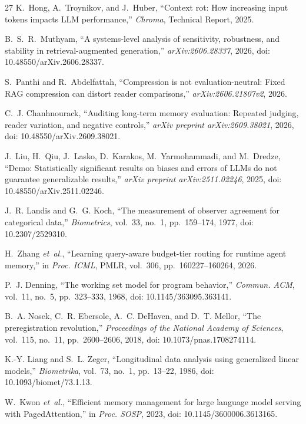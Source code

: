 \begin{thebibliography}{27}
K.~Hong, A.~Troynikov, and J.~Huber, ``Context rot: How increasing input tokens impacts LLM performance,'' \emph{Chroma}, Technical Report, 2025.

B.~S.~R.~Muthyam, ``A systems-level analysis of sensitivity, robustness, and stability in retrieval-augmented generation,'' \emph{arXiv:2606.28337}, 2026, doi: 10.48550/arXiv.2606.28337.

S.~Panthi and R.~Abdelfattah, ``Compression is not evaluation-neutral: Fixed RAG compression can distort reader comparisons,'' \emph{arXiv:2606.21807v2}, 2026.

C.~J. Chanhnourack, ``Auditing long-term memory evaluation: Repeated judging, reader variation, and negative controls,'' \emph{arXiv preprint arXiv:2609.38021}, 2026, doi: 10.48550/arXiv.2609.38021.

J.~Liu, H.~Qiu, J.~Lasko, D.~Karakos, M.~Yarmohammadi, and M.~Dredze, ``Demo: Statistically significant results on biases and errors of LLMs do not guarantee generalizable results,'' \emph{arXiv preprint arXiv:2511.02246}, 2025, doi: 10.48550/arXiv.2511.02246.

J.~R. Landis and G.~G. Koch, ``The measurement of observer agreement for categorical data,'' \emph{Biometrics}, vol.~33, no.~1, pp.~159--174, 1977, doi: 10.2307/2529310.

H.~Zhang \emph{et~al.}, ``Learning query-aware budget-tier routing for runtime agent memory,'' in \emph{Proc. ICML}, PMLR, vol.~306, pp.~160227--160264, 2026.

P.~J. Denning, ``The working set model for program behavior,'' \emph{Commun. ACM}, vol.~11, no.~5, pp.~323--333, 1968, doi: 10.1145/363095.363141.

B.~A. Nosek, C.~R. Ebersole, A.~C. DeHaven, and D.~T. Mellor, ``The preregistration revolution,'' \emph{Proceedings of the National Academy of Sciences}, vol.~115, no.~11, pp.~2600--2606, 2018, doi: 10.1073/pnas.1708274114.

K.-Y. Liang and S.~L. Zeger, ``Longitudinal data analysis using generalized linear models,'' \emph{Biometrika}, vol.~73, no.~1, pp.~13--22, 1986, doi: 10.1093/biomet/73.1.13.

W.~Kwon \emph{et~al.}, ``Efficient memory management for large language model serving with PagedAttention,'' in \emph{Proc. SOSP}, 2023, doi: 10.1145/3600006.3613165.

\end{thebibliography}
